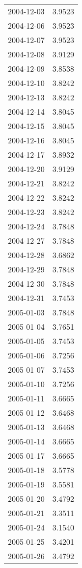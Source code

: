 \begin{tabular}{lr}
2004-12-03 &      3.9523 \\
2004-12-06 &      3.9523 \\
2004-12-07 &      3.9523 \\
2004-12-08 &      3.9129 \\
2004-12-09 &      3.8538 \\
2004-12-10 &      3.8242 \\
2004-12-13 &      3.8242 \\
2004-12-14 &      3.8045 \\
2004-12-15 &      3.8045 \\
2004-12-16 &      3.8045 \\
2004-12-17 &      3.8932 \\
2004-12-20 &      3.9129 \\
2004-12-21 &      3.8242 \\
2004-12-22 &      3.8242 \\
2004-12-23 &      3.8242 \\
2004-12-24 &      3.7848 \\
2004-12-27 &      3.7848 \\
2004-12-28 &      3.6862 \\
2004-12-29 &      3.7848 \\
2004-12-30 &      3.7848 \\
2004-12-31 &      3.7453 \\
2005-01-03 &      3.7848 \\
2005-01-04 &      3.7651 \\
2005-01-05 &      3.7453 \\
2005-01-06 &      3.7256 \\
2005-01-07 &      3.7453 \\
2005-01-10 &      3.7256 \\
2005-01-11 &      3.6665 \\
2005-01-12 &      3.6468 \\
2005-01-13 &      3.6468 \\
2005-01-14 &      3.6665 \\
2005-01-17 &      3.6665 \\
2005-01-18 &      3.5778 \\
2005-01-19 &      3.5581 \\
2005-01-20 &      3.4792 \\
2005-01-21 &      3.3511 \\
2005-01-24 &      3.1540 \\
2005-01-25 &      3.4201 \\
2005-01-26 &      3.4792 \\

\end{tabular}
